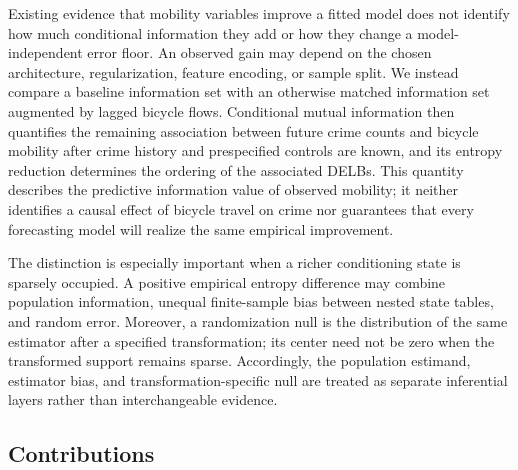 \documentclass[applsci,article,submit,moreauthors]{Definitions/mdpi}
\begin{document}
Existing evidence that mobility variables improve a fitted model does not
identify how much conditional information they add or how they change a
model-independent error floor. An observed gain may depend on the chosen
architecture, regularization, feature encoding, or sample split. We instead
compare a baseline information set with an otherwise matched information
set augmented by lagged bicycle flows. Conditional mutual information then
quantifies the remaining association between future crime counts and
bicycle mobility after crime history and prespecified controls are known,
and its entropy reduction determines the ordering of the associated DELBs.
This quantity describes the predictive information value of observed
mobility; it neither identifies a causal effect of bicycle travel on crime
nor guarantees that every forecasting model will realize the same empirical
improvement.

The distinction is especially important when a richer conditioning state is
sparsely occupied. A positive empirical entropy difference may combine
population information, unequal finite-sample bias between nested state
tables, and random error. Moreover, a randomization null is the distribution
of the same estimator after a specified transformation; its center need not
be zero when the transformed support remains sparse. Accordingly, the
population estimand, estimator bias, and transformation-specific null are
treated as separate inferential layers rather than interchangeable evidence.

\subsection{Contributions}
\label{subsec:intro_contributions}
\end{document}
